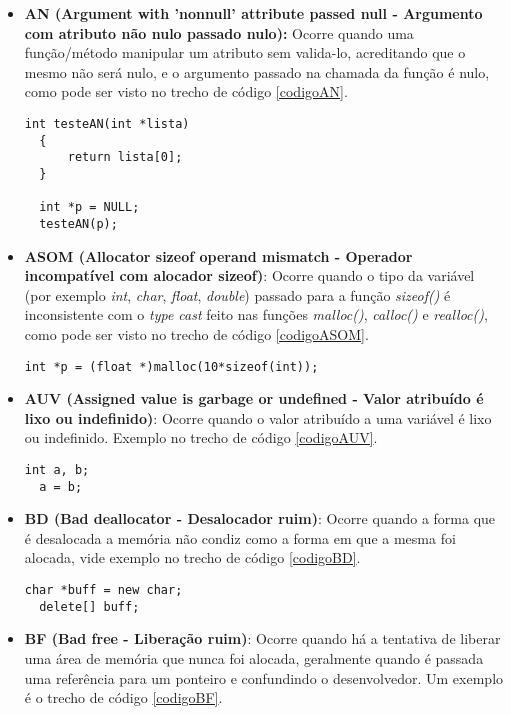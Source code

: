 \begin{itemize}
  \item \textbf{AN (Argument with 'nonnull' attribute passed null - Argumento com atributo não nulo passado nulo):} Ocorre
    quando uma função/método manipular um atributo sem valida-lo, acreditando que o mesmo não será nulo, e o argumento passado
    na chamada da função é nulo, como pode ser visto no trecho de código \ref{codigoAN}.

    \begin{lstlisting}[caption={Código exemplo AN}, label=codigoAN]
  int testeAN(int *lista)
  {
      return lista[0];     
  }
  
  int *p = NULL;
  testeAN(p);
    \end{lstlisting}

  \item \textbf{ASOM (Allocator sizeof operand mismatch - Operador incompatível com alocador sizeof)}: Ocorre quando o tipo
    da variável (por exemplo \textit{int}, \textit{char}, \textit{float}, \textit{double}) passado para a função 
    \textit{sizeof()} é inconsistente com o \textit{type cast} feito nas funções \textit{malloc()}, \textit{calloc()} e 
    \textit{realloc()}, como pode ser visto no trecho de código \ref{codigoASOM}.

    \begin{lstlisting}[caption={Código exemplo ASOM}, label=codigoASOM]
  int *p = (float *)malloc(10*sizeof(int));
    \end{lstlisting}
  \item \textbf{AUV (Assigned value is garbage or undefined - Valor atribuído é lixo ou indefinido)}: Ocorre quando o valor 
    atribuído a uma variável é lixo ou indefinido. Exemplo no trecho de código \ref{codigoAUV}.

    \begin{lstlisting}[caption={Código exemplo AUV}, label=codigoAUV]
  int a, b;
  a = b;
    \end{lstlisting}
  \item \textbf{BD (Bad deallocator - Desalocador ruim)}: Ocorre quando a forma que é desalocada a memória não condiz como a
    forma em que a mesma foi alocada, vide exemplo no trecho de código \ref{codigoBD}.

    \begin{lstlisting}[caption={Código exemplo BD}, label=codigoBD]
  char *buff = new char;
  delete[] buff;
    \end{lstlisting}
  \item \textbf{BF (Bad free - Liberação ruim)}: Ocorre quando há a tentativa de liberar uma área de memória que nunca foi
    alocada, geralmente quando é passada uma referência para um ponteiro e confundindo o desenvolvedor. Um exemplo é o trecho 
    de código \ref{codigoBF}.


\end{itemize}
